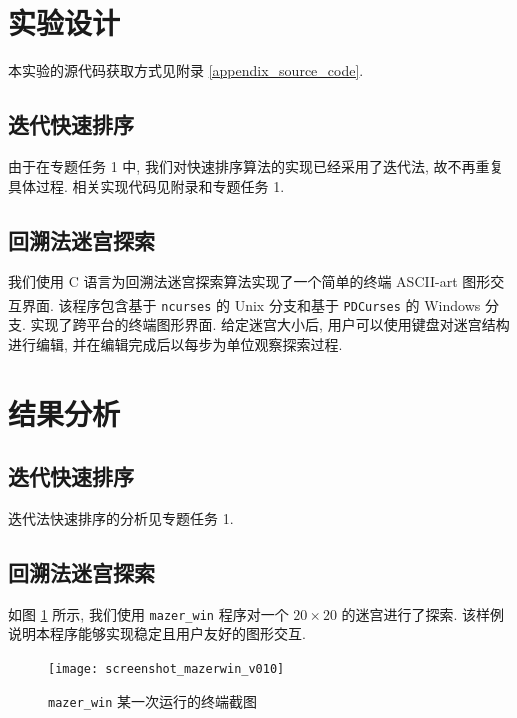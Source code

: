 \documentclass[a4paper]{article}
\begin{document}
\section{实验设计}

本实验的源代码获取方式见附录 \ref{appendix_source_code}.

\subsection{迭代快速排序}

由于在专题任务 1 中, 我们对快速排序算法的实现已经采用了迭代法, 故不再重复具体过程. 相关实现代码见附录和专题任务 1.

\subsection{回溯法迷宫探索}

我们使用 C 语言为回溯法迷宫探索算法实现了一个简单的终端 ASCII-art 图形交互界面. 该程序包含基于 \texttt{ncurses} \cite{bib_ncurses} 的 Unix\textsuperscript{\textregistered} 分支和基于 \texttt{PDCurses} \cite{bib_pdcurses} 的 Windows\textsuperscript{\textregistered} 分支. 实现了跨平台的终端图形界面. 给定迷宫大小后, 用户可以使用键盘对迷宫结构进行编辑, 并在编辑完成后以每步为单位观察探索过程.

\section{结果分析}

\subsection{迭代快速排序}

迭代法快速排序的分析见专题任务 1.

\subsection{回溯法迷宫探索}

如图 \ref{fig_screenshot_mazerwin} 所示, 我们使用 \texttt{mazer\_win} 程序对一个 $20 \times 20$ 的迷宫进行了探索. 该样例说明本程序能够实现稳定且用户友好的图形交互.

\begin{figure}[H]
    \centering
    \texttt{[image: screenshot\_mazerwin\_v010]}
    \caption{\texttt{mazer\_win} 某一次运行的终端截图}
    \label{fig_screenshot_mazerwin}
\end{figure}
\end{document}
